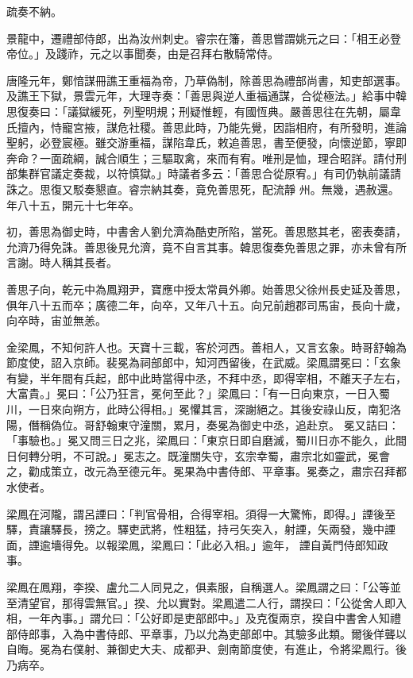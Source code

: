 \begin{pinyinscope}
 疏奏不納。



 景龍中，遷禮部侍郎，出為汝州刺史。睿宗在籓，善思嘗謂姚元之曰：「相王必登帝位。」及踐祚，元之以事聞奏，由是召拜右散騎常侍。



 唐隆元年，鄭愔謀冊譙王重福為帝，乃草偽制，除善思為禮部尚書，知吏部選事。及譙王下獄，景雲元年，大理寺奏：「善思與逆人重福通謀，合從極法。」給事中韓
 思復奏曰：「議獄緩死，列聖明規；刑疑惟輕，有國恆典。嚴善思往在先朝，屬韋氏擅內，恃寵宮掖，謀危社稷。善思此時，乃能先覺，因詣相府，有所發明，進論聖躬，必登宸極。雖交游重福，謀陷韋氏，敕追善思，書至便發，向懷逆節，寧即奔命？一面疏綱，誠合順生；三驅取禽，來而有宥。唯刑是恤，理合昭詳。請付刑部集群官議定奏裁，以符慎獄。」時議者多云：「善思合從原宥。」有司仍執前議請誅之。思復又駁奏懇直。睿宗納其奏，竟免善思死，配流靜
 州。無幾，遇赦還。年八十五，開元十七年卒。



 初，善思為御史時，中書舍人劉允濟為酷吏所陷，當死。善思愍其老，密表奏請，允濟乃得免誅。善思後見允濟，竟不自言其事。韓思復奏免善思之罪，亦未曾有所言謝。時人稱其長者。



 善思子向，乾元中為鳳翔尹，寶應中授太常員外卿。始善思父徐州長史延及善思，俱年八十五而卒；廣德二年，向卒，又年八十五。向兄前趙郡司馬宙，長向十歲，向卒時，宙並無恙。



 金梁鳳，不知何許人也。天寶十三載，客於河西。善相人，又言玄象。時哥舒翰為節度使，詔入京師。裴冕為祠部郎中，知河西留後，在武威。梁鳳謂冕曰：「玄象有變，半年間有兵起，郎中此時當得中丞，不拜中丞，即得宰相，不離天子左右，大富貴。」冕曰：「公乃狂言，冕何至此？」梁鳳曰：「有一日向東京，一日入蜀川，一日來向朔方，此時公得相。」冕懼其言，深謝絕之。其後安祿山反，南犯洛陽，僭稱偽位。哥舒翰東守潼關，累月，奏冕為御史中丞，追赴京。
 冕又詰曰：「事驗也。」冕又問三日之兆，梁鳳曰：「東京日即自磨滅，蜀川日亦不能久，此間日何轉分明，不可說。」冕志之。既潼關失守，玄宗幸蜀，肅宗北如靈武，冕會之，勸成策立，改元為至德元年。冕果為中書侍郎、平章事。冕奏之，肅宗召拜都水使者。



 梁鳳在河隴，謂呂諲曰：「判官骨相，合得宰相。須得一大驚怖，即得。」諲後至驛，責讓驛長，搒之。驛吏武將，性粗猛，持弓矢突入，射諲，矢兩發，幾中諲面，諲逾墻得免。以報梁鳳，梁鳳曰：「此必入相。」逾年，
 諲自黃門侍郎知政事。



 梁鳳在鳳翔，李揆、盧允二人同見之，俱素服，自稱選人。梁鳳謂之曰：「公等並至清望官，那得雲無官。」揆、允以實對。梁鳳遣二人行，謂揆曰：「公從舍人即入相，一年內事。」謂允曰：「公好即是吏部郎中。」及克復兩京，揆自中書舍人知禮部侍郎事，入為中書侍郎、平章事，乃以允為吏部郎中。其驗多此類。爾後佯聾以自晦。冕為右僕射、兼御史大夫、成都尹、劍南節度使，有進止，令將梁鳳行。後乃病卒。




\end{pinyinscope}
